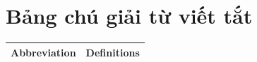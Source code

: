 \chapter*{Bảng chú giải từ viết tắt}

\begin{longtable}{|p{3cm}|p{7cm}|} %
\hline
\textbf{Abbreviation} & \textbf{Definitions} \\
\hline

\hline


\end{longtable}





